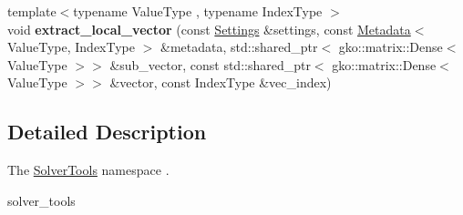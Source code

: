 \begin{DoxyCompactItemize}
{\footnotesize template$<$typename Value\+Type , typename Index\+Type $>$ }\\void {\bfseries extract\+\_\+local\+\_\+vector} (const \hyperlink{structSchwarzWrappers_1_1Settings}{Settings} \&settings, const \hyperlink{structSchwarzWrappers_1_1Metadata}{Metadata}$<$ Value\+Type, Index\+Type $>$ \&metadata, std\+::shared\+\_\+ptr$<$ gko\+::matrix\+::\+Dense$<$ Value\+Type $>$$>$ \&sub\+\_\+vector, const std\+::shared\+\_\+ptr$<$ gko\+::matrix\+::\+Dense$<$ Value\+Type $>$$>$ \&vector, const Index\+Type \&vec\+\_\+index)
\end{DoxyCompactItemize}


\subsection{Detailed Description}
The \hyperlink{namespaceSchwarzWrappers_1_1SolverTools}{Solver\+Tools} namespace . 

solver\+\_\+tools 
